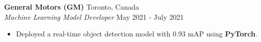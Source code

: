 \documentclass[a4paper]{article}
\begin{document}
\textbf{General Motors (GM)} \hfill Toronto, Canada\\
\textit{Machine Learning Model Developer} \hfill May 2021 - July 2021\\
\vspace{-2.5mm}
\begin{itemize} \itemsep 1pt
	\item Deployed a real-time object detection model with 0.93 mAP using \textbf{PyTorch}.
    \vspace{-1.5mm}
\end{itemize}

\end{document}

